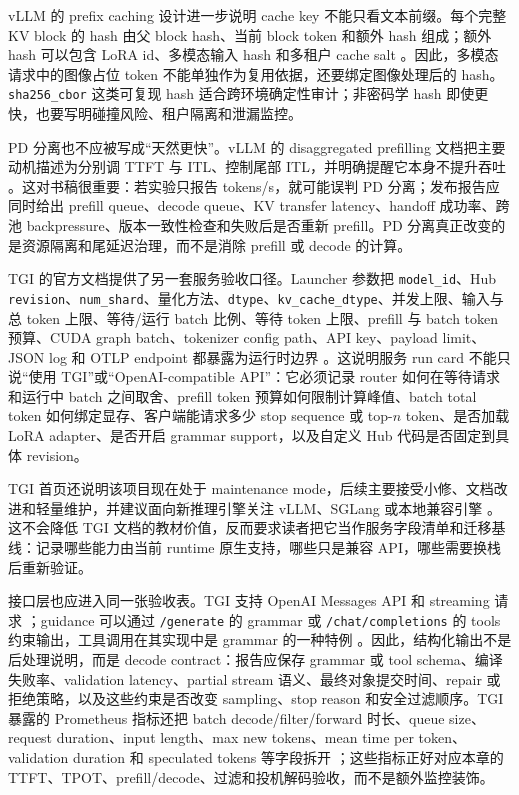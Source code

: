 \documentclass[UTF8,zihao=-4,openany]{ctexbook}
\begin{document}
vLLM 的 prefix caching 设计进一步说明 cache key 不能只看文本前缀。每个完整 KV block 的 hash 由父 block hash、当前 block token 和额外 hash 组成；额外 hash 可以包含 LoRA id、多模态输入 hash 和多租户 cache salt \cite{vllm2026prefixcaching}。因此，多模态请求中的图像占位 token 不能单独作为复用依据，还要绑定图像处理后的 hash。\texttt{sha256\_cbor} 这类可复现 hash 适合跨环境确定性审计；非密码学 hash 即使更快，也要写明碰撞风险、租户隔离和泄漏监控。

PD 分离也不应被写成“天然更快”。vLLM 的 disaggregated prefilling 文档把主要动机描述为分别调 TTFT 与 ITL、控制尾部 ITL，并明确提醒它本身不提升吞吐 \cite{vllm2026disaggregatedprefill}。这对书稿很重要：若实验只报告 tokens/s，就可能误判 PD 分离；发布报告应同时给出 prefill queue、decode queue、KV transfer latency、handoff 成功率、跨池 backpressure、版本一致性检查和失败后是否重新 prefill。PD 分离真正改变的是资源隔离和尾延迟治理，而不是消除 prefill 或 decode 的计算。

TGI 的官方文档提供了另一套服务验收口径。Launcher 参数把 \texttt{model\_id}、Hub \texttt{revision}、\texttt{num\_shard}、量化方法、\texttt{dtype}、\texttt{kv\_cache\_dtype}、并发上限、输入与总 token 上限、等待/运行 batch 比例、等待 token 上限、prefill 与 batch token 预算、CUDA graph batch、tokenizer config path、API key、payload limit、JSON log 和 OTLP endpoint 都暴露为运行时边界 \cite{huggingface2026tgilauncher}。这说明服务 run card 不能只说“使用 TGI”或“OpenAI-compatible API”：它必须记录 router 如何在等待请求和运行中 batch 之间取舍、prefill token 预算如何限制计算峰值、batch total token 如何绑定显存、客户端能请求多少 stop sequence 或 top-$n$ token、是否加载 LoRA adapter、是否开启 grammar support，以及自定义 Hub 代码是否固定到具体 revision。

TGI 首页还说明该项目现在处于 maintenance mode，后续主要接受小修、文档改进和轻量维护，并建议面向新推理引擎关注 vLLM、SGLang 或本地兼容引擎 \cite{huggingface2026tgiindex}。这不会降低 TGI 文档的教材价值，反而要求读者把它当作服务字段清单和迁移基线：记录哪些能力由当前 runtime 原生支持，哪些只是兼容 API，哪些需要换栈后重新验证。

接口层也应进入同一张验收表。TGI 支持 OpenAI Messages API 和 streaming 请求 \cite{huggingface2026tgiapi}；guidance 可以通过 \texttt{/generate} 的 grammar 或 \texttt{/chat/completions} 的 tools 约束输出，工具调用在其实现中是 grammar 的一种特例 \cite{huggingface2026tgiguidance}。因此，结构化输出不是后处理说明，而是 decode contract：报告应保存 grammar 或 tool schema、编译失败率、validation latency、partial stream 语义、最终对象提交时间、repair 或拒绝策略，以及这些约束是否改变 sampling、stop reason 和安全过滤顺序。TGI 暴露的 Prometheus 指标还把 batch decode/filter/forward 时长、queue size、request duration、input length、max new tokens、mean time per token、validation duration 和 speculated tokens 等字段拆开 \cite{huggingface2026tgimetrics}；这些指标正好对应本章的 TTFT、TPOT、prefill/decode、过滤和投机解码验收，而不是额外监控装饰。
\end{document}
